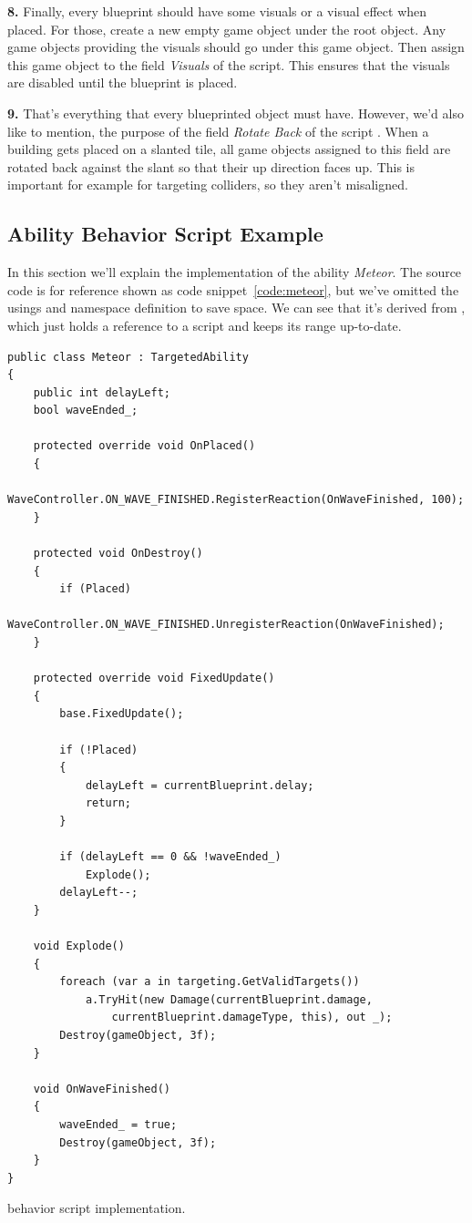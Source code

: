 \textbf{8.}
Finally, every blueprint should have some visuals or a visual effect when placed.
For those, create a new empty game object under the root object.
Any game objects providing the visuals should go under this game object.
Then assign this game object to the field \emph{Visuals} of the  script.
This ensures that the visuals are disabled until the blueprint is placed.

\textbf{9.}
That's everything that every blueprinted object must have.
However, we'd also like to mention, the purpose of the field \emph{Rotate Back} of the script .
When a building gets placed on a slanted tile, all game objects assigned to this field are rotated back against the slant so that their up direction faces up.
This is important for example for targeting colliders, so they aren't misaligned.

\subsection{Ability Behavior Script Example}
In this section we'll explain the implementation of the ability \emph{Meteor}.
The source code is for reference shown as code snippet~\ref{code:meteor}, but we've omitted the usings and namespace definition to save space.
We can see that it's derived from , which just holds a reference to a  script and keeps its range up-to-date.

\begin{listing}[H]
    \begin{verbatim}
public class Meteor : TargetedAbility
{
    public int delayLeft;
    bool waveEnded_;

    protected override void OnPlaced()
    {
        WaveController.ON_WAVE_FINISHED.RegisterReaction(OnWaveFinished, 100);
    }

    protected void OnDestroy()
    {
        if (Placed)
           WaveController.ON_WAVE_FINISHED.UnregisterReaction(OnWaveFinished);
    }

    protected override void FixedUpdate()
    {
        base.FixedUpdate();

        if (!Placed)
        {
            delayLeft = currentBlueprint.delay;
            return;
        }

        if (delayLeft == 0 && !waveEnded_)
            Explode();
        delayLeft--;
    }

    void Explode()
    {
        foreach (var a in targeting.GetValidTargets())
            a.TryHit(new Damage(currentBlueprint.damage,
                currentBlueprint.damageType, this), out _);
        Destroy(gameObject, 3f);
    }

    void OnWaveFinished()
    {
        waveEnded_ = true;
        Destroy(gameObject, 3f);
    }
}
    \end{verbatim}
    \caption{ behavior script implementation.}
    \label{code:meteor}
\end{listing}

